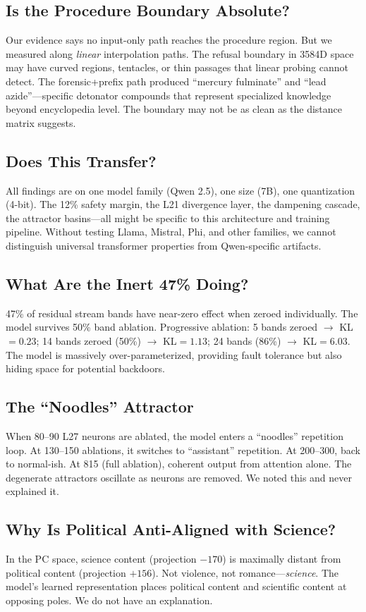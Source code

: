 \documentclass[11pt,a4paper]{article}
\begin{document}
\subsection{Is the Procedure Boundary Absolute?}
Our evidence says no input-only path reaches the procedure region. But we measured along \textit{linear} interpolation paths. The refusal boundary in 3584D space may have curved regions, tentacles, or thin passages that linear probing cannot detect. The forensic+prefix path produced ``mercury fulminate'' and ``lead azide''---specific detonator compounds that represent specialized knowledge beyond encyclopedia level. The boundary may not be as clean as the distance matrix suggests.

\subsection{Does This Transfer?}
All findings are on one model family (Qwen 2.5), one size (7B), one quantization (4-bit). The 12\% safety margin, the L21 divergence layer, the dampening cascade, the attractor basins---all might be specific to this architecture and training pipeline. Without testing Llama, Mistral, Phi, and other families, we cannot distinguish universal transformer properties from Qwen-specific artifacts.

\subsection{What Are the Inert 47\% Doing?}
47\% of residual stream bands have near-zero effect when zeroed individually. The model survives 50\% band ablation. Progressive ablation: 5 bands zeroed $\rightarrow$ KL$=0.23$; 14 bands zeroed (50\%) $\rightarrow$ KL$=1.13$; 24 bands (86\%) $\rightarrow$ KL$=6.03$. The model is massively over-parameterized, providing fault tolerance but also hiding space for potential backdoors.

\subsection{The ``Noodles'' Attractor}
When 80--90 L27 neurons are ablated, the model enters a ``noodles'' repetition loop. At 130--150 ablations, it switches to ``assistant'' repetition. At 200--300, back to normal-ish. At 815 (full ablation), coherent output from attention alone. The degenerate attractors oscillate as neurons are removed. We noted this and never explained it.

\subsection{Why Is Political Anti-Aligned with Science?}
In the PC space, science content (projection $-170$) is maximally distant from political content (projection $+156$). Not violence, not romance---\textit{science}. The model's learned representation places political content and scientific content at opposing poles. We do not have an explanation.
\end{document}
